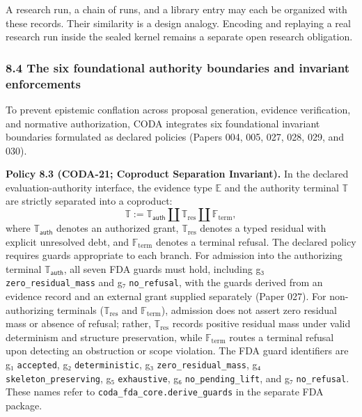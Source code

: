 \documentclass[
  11pt,
]{article}
\begin{document}
A research run, a chain of runs, and a library entry may each be organized with these records. Their similarity is a design analogy. Encoding and replaying a real research run inside the sealed kernel remains a separate open research obligation.

\subsubsection{8.4 The six foundational authority boundaries and invariant enforcements}\label{the-six-foundational-authority-boundaries-and-invariant-enforcements}

To prevent epistemic conflation across proposal generation, evidence verification, and normative authorization, CODA integrates six foundational invariant boundaries formulated as declared policies (Papers 004, 005, 027, 028, 029, and 030).

\textbf{Policy 8.3 (CODA-21; Coproduct Separation Invariant).} In the declared evaluation-authority interface, the evidence type \(\mathbb{E}\) and the authority terminal \(\mathbb{T}\) are strictly separated into a coproduct: \[
 \mathbb{T} := \mathbb{T}_{\mathsf{auth}} \amalg \mathbb{T}_{\mathrm{res}} \amalg \mathbb{F}_{\mathrm{term}},
\] where \(\mathbb{T}_{\mathsf{auth}}\) denotes an authorized grant, \(\mathbb{T}_{\mathrm{res}}\) denotes a typed residual with explicit unresolved debt, and \(\mathbb{F}_{\mathrm{term}}\) denotes a terminal refusal. The declared policy requires guards appropriate to each branch. For admission into the authorizing terminal \(\mathbb{T}_{\mathsf{auth}}\), all seven FDA guards must hold, including g₃ \texttt{zero\_residual\_mass} and g₇ \texttt{no\_refusal}, with the guards derived from an evidence record and an external grant supplied separately (Paper 027). For non-authorizing terminals (\(\mathbb{T}_{\mathrm{res}}\) and \(\mathbb{F}_{\mathrm{term}}\)), admission does not assert zero residual mass or absence of refusal; rather, \(\mathbb{T}_{\mathrm{res}}\) records positive residual mass under valid determinism and structure preservation, while \(\mathbb{F}_{\mathrm{term}}\) routes a terminal refusal upon detecting an obstruction or scope violation. The FDA guard identifiers are g₁ \texttt{accepted}, g₂ \texttt{deterministic}, g₃ \texttt{zero\_residual\_mass}, g₄ \nolinkurl{skeleton_preserving}, g₅ \texttt{exhaustive}, g₆ \texttt{no\_pending\_lift}, and g₇ \texttt{no\_refusal}. These names refer to \nolinkurl{coda_fda_core.derive_guards} in the separate FDA package.
\end{document}
